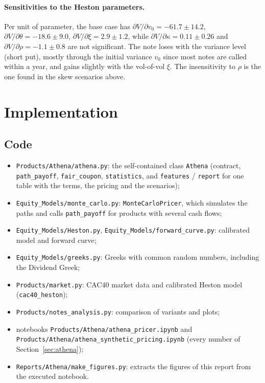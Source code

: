 \documentclass[11pt,a4paper]{article}
\newcommand{\code}[1]{\texttt{#1}}
\begin{document}
\paragraph{Sensitivities to the Heston parameters.} Per unit of parameter, the base case has
$\partial V/\partial v_0 = -61.7 \pm 14.2$, $\partial V/\partial \theta = -18.6 \pm 9.0$,
$\partial V/\partial \xi = 2.9 \pm 1.2$, while $\partial V/\partial \kappa = 0.11 \pm 0.26$ and
$\partial V/\partial \rho = -1.1 \pm 0.8$ are not significant. The note loses with the variance level (short put),
mostly through the initial variance $v_0$ since most notes are called within a year, and gains slightly with the
vol-of-vol $\xi$. The insensitivity to $\rho$ is the one found in the skew scenarios above.

\section{Implementation}\label{sec:implementation}

\subsection{Code}
\begin{itemize}
\item \code{Products/Athena/athena.py}: the self-contained class \code{Athena} (contract, \code{path\_payoff},
\code{fair\_coupon}, \code{statistics}, and \code{features} / \code{report} for one table with the terms, the
pricing and the scenarios);
\item \code{Equity\_Models/monte\_carlo.py}: \code{MonteCarloPricer}, which simulates the paths and calls
\code{path\_payoff} for products with several cash flows;
\item \code{Equity\_Models/Heston.py}, \code{Equity\_Models/forward\_curve.py}: calibrated model and forward curve;
\item \code{Equity\_Models/greeks.py}: Greeks with common random numbers, including the Dividend Greek;
\item \code{Products/market.py}: CAC40 market data and calibrated Heston model (\code{cac40\_heston});
\item \code{Products/notes\_analysis.py}: comparison of variants and plots;
\item notebooks \code{Products/Athena/athena\_pricer.ipynb} and\\
\code{Products/Athena/athena\_synthetic\_pricing.ipynb} (every number of Section~\ref{sec:athena});
\item \code{Reports/Athena/make\_figures.py}: extracts the figures of this report from the executed notebook.
\end{itemize}
\end{document}
